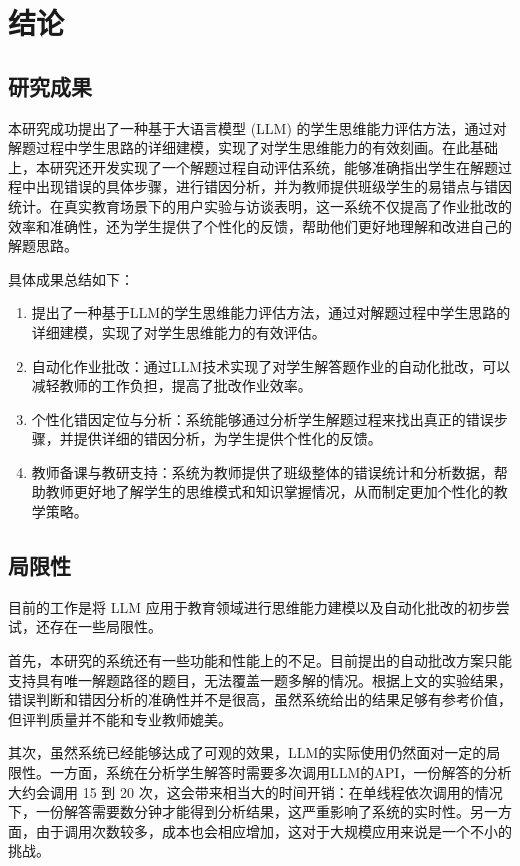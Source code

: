 
\chapter{结论}

\section{研究成果}

本研究成功提出了一种基于大语言模型 (LLM) 的学生思维能力评估方法，通过对解题过程中学生思路的详细建模，实现了对学生思维能力的有效刻画。在此基础上，本研究还开发实现了一个解题过程自动评估系统，能够准确指出学生在解题过程中出现错误的具体步骤，进行错因分析，并为教师提供班级学生的易错点与错因统计。在真实教育场景下的用户实验与访谈表明，这一系统不仅提高了作业批改的效率和准确性，还为学生提供了个性化的反馈，帮助他们更好地理解和改进自己的解题思路。

具体成果总结如下：

\begin{enumerate}
    \item 提出了一种基于LLM的学生思维能力评估方法，通过对解题过程中学生思路的详细建模，实现了对学生思维能力的有效评估。
    \item 自动化作业批改：通过LLM技术实现了对学生解答题作业的自动化批改，可以减轻教师的工作负担，提高了批改作业效率。
    \item 个性化错因定位与分析：系统能够通过分析学生解题过程来找出真正的错误步骤，并提供详细的错因分析，为学生提供个性化的反馈。
    \item 教师备课与教研支持：系统为教师提供了班级整体的错误统计和分析数据，帮助教师更好地了解学生的思维模式和知识掌握情况，从而制定更加个性化的教学策略。
\end{enumerate}

\section{局限性}

目前的工作是将 LLM 应用于教育领域进行思维能力建模以及自动化批改的初步尝试，还存在一些局限性。

首先，本研究的系统还有一些功能和性能上的不足。目前提出的自动批改方案只能支持具有唯一解题路径的题目，无法覆盖一题多解的情况。根据上文的实验结果，错误判断和错因分析的准确性并不是很高，虽然系统给出的结果足够有参考价值，但评判质量并不能和专业教师媲美。

其次，虽然系统已经能够达成了可观的效果，LLM的实际使用仍然面对一定的局限性。一方面，系统在分析学生解答时需要多次调用LLM的API，一份解答的分析大约会调用 15 到 20 次，这会带来相当大的时间开销：在单线程依次调用的情况下，一份解答需要数分钟才能得到分析结果，这严重影响了系统的实时性。另一方面，由于调用次数较多，成本也会相应增加，这对于大规模应用来说是一个不小的挑战。

